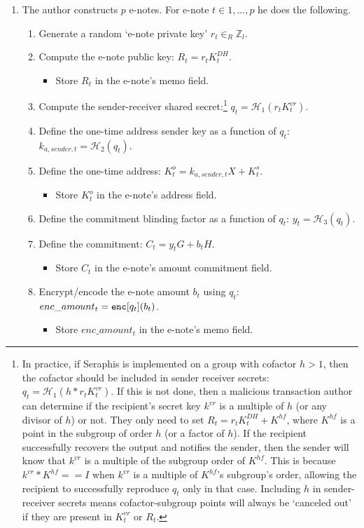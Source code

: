 \begin{enumerate}
    \item The author constructs $p$ e-notes. For e-note $t \in 1,...,p$ he does the following.
    \begin{enumerate}
        \item Generate a random `e-note private key' $r_t \in_R \mathbb{Z}_l$.
        \item Compute the e-note public key: $R_t = r_t K^{DH}_t$.
        \begin{itemize}
            \item Store $R_t$ in the e-note's memo field.
        \end{itemize}
        \item Compute the sender-receiver shared secret:\footnote{\label{footnote-mul-cofactor}In practice, if Seraphis is implemented on a group with cofactor $h > 1$, then the cofactor should be included in sender receiver secrets: $q_t = \mathcal{H}_1(h*r_t K^{vr}_t)$. If this is not done, then a malicious transaction author can determine if the recipient's secret key $k^{vr}$ is a multiple of $h$ (or any divisor of $h$) or not. They only need to set $R_t = r_t K^{DH}_t + K^{hf}$, where $K^{hf}$ is a point in the subgroup of order $h$ (or a factor of $h$). If the recipient successfully recovers the output and notifies the sender, then the sender will know that $k^{vr}$ is a multiple of the subgroup order of $K^{hf}$. This is because $k^{vr} * K^{hf} == I$ when $k^{vr}$ is a multiple of $K^{hf}$'s subgroup's order, allowing the recipient to successfully reproduce $q_t$ only in that case. Including $h$ in sender-receiver secrets means cofactor-subgroup points will always be `canceled out' if they are present in $K^{vr}_t$ or $R_t$.} $q_t = \mathcal{H}_1(r_t K^{vr}_t)$.
        \item Define the one-time address sender key as a function of $q_t$: $k_{a,sender,t} = \mathcal{H}_2(q_t)$.
        \item Define the one-time address: $K^o_t = k_{a,sender,t} X + K^s_t$.
        \begin{itemize}
            \item Store $K^o_t$ in the e-note's address field.
        \end{itemize}
        \item Define the commitment blinding factor as a function of $q_t$: $y_t = \mathcal{H}_3(q_t)$.
        \item Define the commitment: $C_t = y_t G + b_t H$.
        \begin{itemize}
            \item Store $C_t$ in the e-note's amount commitment field.
        \end{itemize}
        \item Encrypt/encode the e-note amount $b_t$ using $q_t$: $enc\_amount_t = \textrm{\tt enc}[q_t](b_t)$.
        \begin{itemize}
            \item Store $enc\_amount_t$ in the e-note's memo field.
        \end{itemize}
    \end{enumerate}


\end{enumerate}
